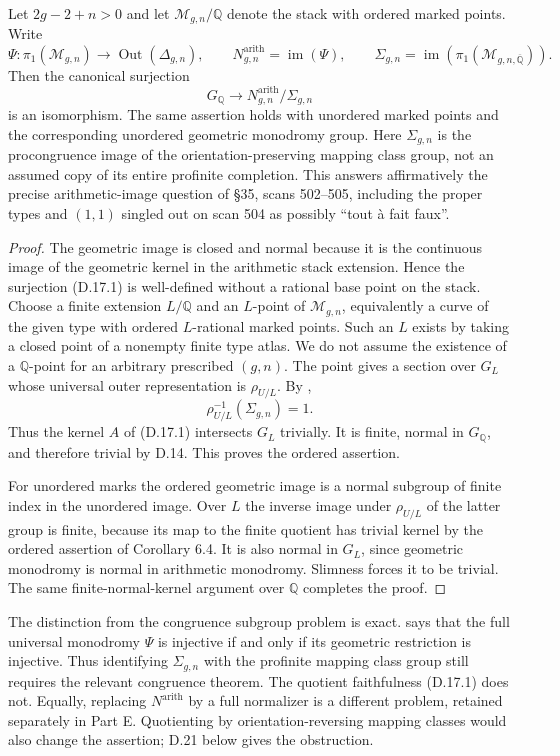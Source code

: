 Let $2g-2+n>0$ and let $\mathcal M_{g,n}/\mathbb Q$ denote the stack with
ordered marked points.  Write
\[
 \Psi:\pi_1(\mathcal M_{g,n})\longrightarrow
                \operatorname{Out}(\Delta_{g,n}),\qquad
 N^{\mathrm{arith}}_{g,n}=\operatorname{im}(\Psi),\qquad
 \Sigma_{g,n}=\operatorname{im}(\pi_1(\mathcal M_{g,n,\overline{\mathbb Q}})).
\]
Then the canonical surjection
\[
 G_{\mathbb Q}\longrightarrow
       N^{\mathrm{arith}}_{g,n}/\Sigma_{g,n}
 \tag{D.17.1}
\]
is an isomorphism.  The same assertion holds with unordered marked points
and the corresponding unordered geometric monodromy group.
Here $\Sigma_{g,n}$ is the procongruence image of the orientation-preserving
mapping class group, not an assumed copy of its entire profinite completion.
This answers affirmatively the precise arithmetic-image question of \S35,
scans 502--505, including the proper types and $(1,1)$ singled out on scan 504
as possibly ``tout \`a fait faux''.
\begin{proof}
The geometric image is closed and normal because it is the continuous image
of the geometric kernel in the arithmetic stack extension.  Hence the
surjection (D.17.1) is well-defined without a rational base point on the stack.
Choose a finite extension $L/\mathbb Q$ and an $L$-point of
$\mathcal M_{g,n}$, equivalently a curve of the given type with ordered
$L$-rational marked points.  Such an $L$ exists by taking a closed point of
a nonempty finite type atlas.  We do not assume the existence of a
$\mathbb Q$-point for an arbitrary prescribed $(g,n)$.
The point gives a section over $G_L$ whose universal outer representation is
$\rho_{U/L}$.  By \citet[Corollary 6.4]{HoshiMochizuki2011},
\[
 \rho_{U/L}^{-1}(\Sigma_{g,n})=1.
\]
Thus the kernel $A$ of (D.17.1) intersects $G_L$ trivially.  It is finite,
normal in $G_{\mathbb Q}$, and therefore trivial by D.14.  This proves the
ordered assertion.

For unordered marks the ordered geometric image is a normal subgroup of
finite index in the unordered image.  Over $L$ the inverse image under
$\rho_{U/L}$ of the latter group is finite, because its map to the finite
quotient has trivial kernel by the ordered assertion of Corollary 6.4.
It is also normal in $G_L$, since geometric monodromy is normal in arithmetic
monodromy.  Slimness forces it to be trivial.  The same finite-normal-kernel
argument over $\mathbb Q$ completes the proof.
\end{proof}
The distinction from the congruence subgroup problem is exact.
\citet[Corollary 6.5]{HoshiMochizuki2011} says that the full universal
monodromy $\Psi$ is injective if and only if its geometric restriction is
injective.  Thus identifying $\Sigma_{g,n}$ with the profinite mapping class
group still requires the relevant congruence theorem.  The quotient
faithfulness (D.17.1) does not.  Equally, replacing $N^{\mathrm{arith}}$ by
a full normalizer is a different problem, retained separately in Part E.
Quotienting by orientation-reversing mapping classes would also change the
assertion; D.21 below gives the obstruction.

